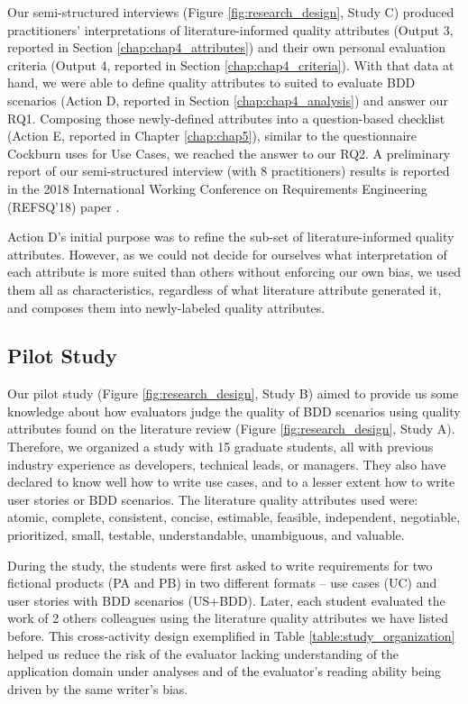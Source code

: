 Our semi-structured interviews (Figure \ref{fig:research_design}, Study C) produced practitioners' interpretations of literature-informed quality attributes (Output 3, reported in Section \ref{chap:chap4_attributes}) and their own personal evaluation criteria (Output 4, reported in Section \ref{chap:chap4_criteria}). With that data at hand, we were able to define quality attributes to suited to evaluate BDD scenarios (Action D, reported in Section \ref{chap:chap4_analysis}) and answer our RQ1. Composing those newly-defined attributes into a question-based checklist (Action E, reported in Chapter \ref{chap:chap5}), similar to the questionnaire Cockburn \cite{Cockburn_2000} uses for Use Cases, we reached the answer to our RQ2. A preliminary report of our semi-structured interview (with 8 practitioners) results is reported in the 2018 International Working Conference on Requirements Engineering (REFSQ'18) paper \cite{Refsq_2018}. 

Action D's initial purpose was to refine the sub-set of literature-informed quality attributes. However, as we could not decide for ourselves what interpretation of each attribute is more suited than others without enforcing our own bias, we used them all as characteristics, regardless of what literature attribute generated it, and composes them into newly-labeled quality attributes.

\subsection{Pilot Study}

Our pilot study (Figure \ref{fig:research_design}, Study B) aimed to provide us some knowledge about how evaluators judge the quality of BDD scenarios using quality attributes found on the literature review (Figure \ref{fig:research_design}, Study A). Therefore, we organized a study with 15 graduate students, all with previous industry experience as developers, technical leads, or managers. They also have declared to know well how to write use cases, and to a lesser extent how to write user stories or BDD scenarios. The literature quality attributes used were: atomic, complete, consistent, concise, estimable, feasible, independent, negotiable, prioritized, small, testable, understandable, unambiguous, and valuable.

During the study, the students were first asked to write requirements for two fictional products (PA and PB) in two different formats -- use cases (UC) and user stories with BDD scenarios (US+BDD). Later, each student evaluated the work of 2 others colleagues using the literature quality attributes we have listed before. This cross-activity design exemplified in Table \ref{table:study_organization} helped us reduce the risk of the evaluator lacking understanding of the application domain under analyses and of the evaluator's reading ability being driven by the same writer's bias.

